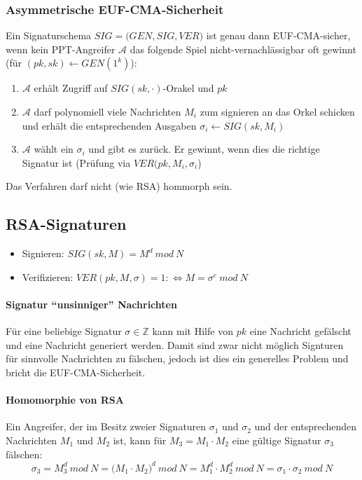 \subsubsection{Asymmetrische EUF-CMA-Sicherheit}
Ein Signaturschema \(SIG = \big(GEN,SIG,VER\big)\) ist genau dann EUF-CMA-sicher, wenn kein PPT-Angreifer \(\mathcal{A}\) das folgende Spiel nicht-vernachlässigbar oft gewinnt (für \((pk,sk) \leftarrow GEN(1^k)\)):
\begin{enumerate}
	\item \(\mathcal{A}\) erhält Zugriff auf \(SIG(sk,\cdot)\)-Orakel und \(pk\)
	\item \(\mathcal{A}\) darf polynomiell viele Nachrichten \(M_i\) zum signieren an das Orkel schicken und erhält die entsprechenden Ausgaben \(\sigma_i \leftarrow SIG(sk,M_i)\)
	\item \(\mathcal{A}\) wählt ein \(\sigma_i\) und gibt es zurück. Er gewinnt, wenn dies die richtige Signatur ist (Prüfung via \(VER(pk,M_i,\sigma_i\))
\end{enumerate}
Das Verfahren darf nicht (wie RSA) hommorph sein.


\subsection{RSA-Signaturen}
\begin{itemize}
	\item Signieren: \(SIG(sk,M) = M^d~mod~N\)
	\item Verifizieren: \(VER(pk,M,\sigma)=1 :\Leftrightarrow M = \sigma^e~mod~N\)
\end{itemize}

\paragraph{Signatur "`unsinniger"' Nachrichten}
Für eine beliebige Signatur \(\sigma \in \mathbb{Z}\) kann mit Hilfe von \(pk\) eine Nachricht gefälscht und eine Nachricht generiert werden. Damit sind zwar nicht möglich Signturen für sinnvolle Nachrichten zu fälschen, jedoch ist dies ein generelles Problem und bricht die EUF-CMA-Sicherheit.

\paragraph{Homomorphie von RSA}
Ein Angreifer, der im Besitz zweier Signaturen \(\sigma_1\) und \(\sigma_2\) und der entsprechenden Nachrichten \(M_1\) und \(M_2\) ist, kann für \(M_3 = M_1 \cdot M_2\) eine gültige Signatur \(\sigma_3\) fälschen:
\[\sigma_3 = M^d_3~mod~N = \big(M_1 \cdot M_2\big)^d~mod~N = M_1^d \cdot M_2^d~mod~N = \sigma_1 \cdot \sigma_2~mod~N\]

